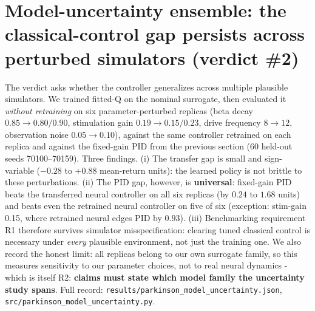 \section{Model-uncertainty ensemble: the classical-control gap persists across perturbed simulators (verdict \#2)}
The verdict asks whether the controller generalizes across multiple plausible simulators. We trained fitted-Q on the nominal surrogate, then evaluated it \emph{without retraining} on six parameter-perturbed replicas (beta decay $0.85 \to 0.80/0.90$, stimulation gain $0.19 \to 0.15/0.23$, drive frequency $8 \to 12$, observation noise $0.05 \to 0.10$), against the same controller retrained on each replica and against the fixed-gain PID from the previous section (60 held-out seeds 70100--70159). Three findings. (i) The transfer gap is small and sign-variable ($-0.28$ to $+0.88$ mean-return units): the learned policy is not brittle to these perturbations. (ii) The PID gap, however, is \textbf{universal}: fixed-gain PID beats the transferred neural controller on all six replicas (by $0.24$ to $1.68$ units) and beats even the retrained neural controller on five of six (exception: stim-gain 0.15, where retrained neural edges PID by $0.93$). (iii) Benchmarking requirement R1 therefore survives simulator misspecification: clearing tuned classical control is necessary under \emph{every} plausible environment, not just the training one. We also record the honest limit: all replicas belong to our own surrogate family, so this measures sensitivity to our parameter choices, not to real neural dynamics - which is itself R2: \textbf{claims must state which model family the uncertainty study spans}. Full record: \texttt{results/parkinson\_model\_uncertainty.json}, \texttt{src/parkinson\_model\_uncertainty.py}.


